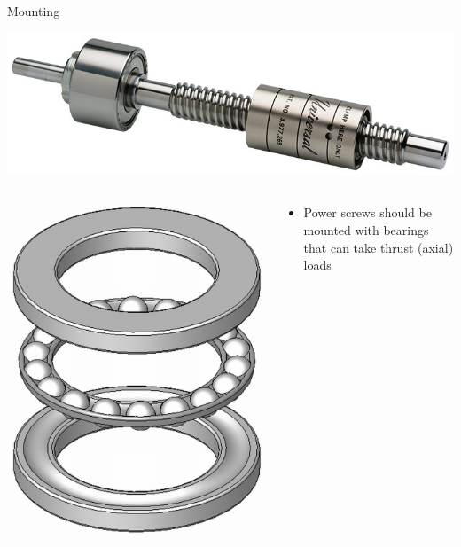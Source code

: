 \documentclass[10pt, svgnames]{beamer}
\begin{document}
\begin{frame}[label={sec:org30c7e97}]{Mounting}
\begin{center}
\includegraphics[width=.9\linewidth]{./pictures/thrust-bearing.jpg}
\end{center}

\begin{columns}
\begin{column}{0.5\columnwidth}
\begin{center}
\includegraphics[height=0.5\textheight]{./pictures/thrust-bearing-detailed.png}
\end{center}
\end{column}

\begin{column}{0.5\columnwidth}
\begin{itemize}
\item Power screws should be mounted with bearings that can take thrust (axial) loads
\end{itemize}
\end{column}
\end{columns}
\end{frame}
\end{document}
